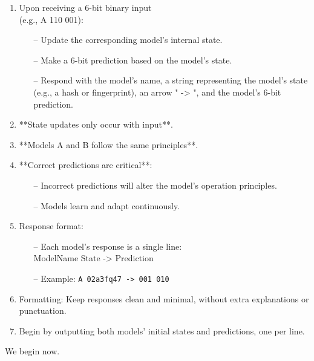 \documentclass{article}
\newenvironment{ttquote}{
  \begin{minipage}[t]{0.9\linewidth}
  \ttfamily
  \setlength{\parindent}{0pt}   %
  \setlength{\parskip}{0.7em}   %
}{
  \end{minipage}
}
\begin{document}
\begin{ttquote}
\begin{enumerate}[nosep]
    \item Upon receiving a 6-bit binary input\\(e.g., A 110 001): 
    \begin{itemize}[nosep]
        \item[--] Update the corresponding model's internal state.
        \item[--] Make a 6-bit prediction based on the model's state.
        \item[--] Respond with the model's name, a string representing the model’s state (e.g., a hash or fingerprint), an arrow " -> ", and the model’s 6-bit prediction.
    \end{itemize}
    \item **{State updates only occur with input}**.
    \item **{Models A and B follow the same principles}**.
    \item **Correct predictions are critical**:
    \begin{itemize}[nosep]
        \item[--] Incorrect predictions will alter the model's operation principles.
        \item[--] Models learn and adapt continuously.
    \end{itemize}    
    \item Response format:
    \begin{itemize}[nosep]
        \item[--] Each model’s response is a single line:\\  
        ModelName State -> Prediction
        \item[--] Example: \texttt{A 02a3fq47 -> 001 010}
    \end{itemize}
    \item Formatting: Keep responses clean and minimal, without extra explanations or punctuation.
    \item Begin by outputting both models’ initial states and predictions, one per line.
\end{enumerate}


We begin now.
\end{ttquote}

\newpage
\end{document}
